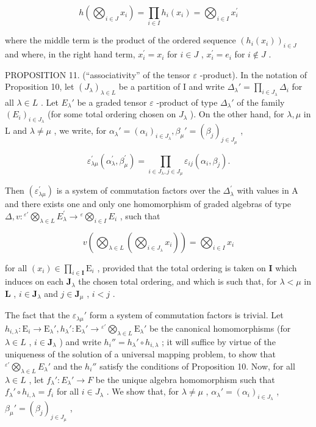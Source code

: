 \[
h \left(\bigotimes_ {i \in J} x _ {i}\right) = \prod_ {i \in I} h _ {i} \left(x _ {i}\right) = \bigotimes_ {i \in I} x _ {i} ^ {\prime}
\]

where the middle term is the product of the ordered sequence \((h_i(x_i))_{i\in J}\) and where, in the right hand term, \(x_{i}^{\prime} = x_{i}\) for \(i\in J\) , \(x_{i}^{\prime} = e_{i}\) for \(i\notin J\) .

PROPOSITION 11. (``associativity'' of the tensor \(\varepsilon\) -product). In the notation of Proposition 10, let \((J_{\lambda})_{\lambda \in L}\) be a partition of I and write \(\Delta_{\lambda}' = \prod_{i \in J_{\lambda}} \Delta_i\) for all \(\lambda \in L\) . Let \(E_{\lambda}'\) be a graded tensor \(\varepsilon\) -product of type \(\Delta_{\lambda}'\) of the family \((E_i)_{i \in J_{\lambda}}\) (for some total ordering chosen on \(J_{\lambda}\) ). On the other hand, for \(\lambda, \mu\) in L and \(\lambda \neq \mu\) , we write, for \(\alpha_{\lambda}' = (\alpha_i)_{i \in J_{\lambda}}, \beta_{\mu}' = (\beta_j)_{j \in J_{\mu}}\) ,

\[
\varepsilon_ {\lambda \mu} ^ {\prime} (\alpha _ {\lambda} ^ {\prime}, \beta_ {\mu} ^ {\prime}) = \prod_ {i \in J _ {\lambda}, j \in J _ {\mu}} \varepsilon_ {i j} (\alpha_ {i}, \beta_ {j}).\tag{32}
\]

Then \((\varepsilon_{\lambda \mu}^{\prime})\) is a system of commutation factors over the \(\Delta_{\lambda}^{\prime}\) with values in A and there exists one and only one homomorphism of graded algebras of type \(\Delta, v: {}^{\varepsilon'}\bigotimes_{\lambda \in L} E_{\lambda}^{\prime} \to {}^{\varepsilon}\bigotimes_{i \in I} E_{i}\) , such that

\[
v \left(\bigotimes_ {\lambda \in L} \left(\bigotimes_ {i \in J _ {\lambda}} x _ {i}\right)\right) = \bigotimes_ {i \in I} x _ {i}\tag{33}
\]

for all \((x_{i})\in \prod_{i\in \mathbf{I}}\mathrm{E}_{i}\) , provided that the total ordering is taken on \(\mathbf{I}\) which induces on each \(\mathbf{J}_{\lambda}\) the chosen total ordering, and which is such that, for \(\lambda < \mu\) in \(\mathbf{L}\) , \(i\in \mathbf{J}_{\lambda}\) and \(j\in \mathbf{J}_{\mu}\) , \(i < j\) .

The fact that the \(\varepsilon_{\lambda \mu}'\) form a system of commutation factors is trivial. Let \(h_{i,\lambda}:\mathrm{E}_i\to \mathrm{E}_{\lambda}', h_{\lambda}':\mathrm{E}_{\lambda}'\to {}^{\varepsilon'}\bigotimes_{\lambda \in L}\mathrm{E}_{\lambda}'\) be the canonical homomorphisms (for \(\lambda \in L\) , \(i\in \mathbf{J}_{\lambda}\) ) and write \(h_i'' = h_\lambda' \circ h_{i,\lambda}\) ; it will suffice by virtue of the uniqueness of the solution of a universal mapping problem, to show that \({}^{\varepsilon'}\bigotimes_{\lambda \in L} E_{\lambda}'\) and the \(h_i''\) satisfy the conditions of Proposition 10. Now, for all \(\lambda \in L\) , let \(f_{\lambda}': E_{\lambda}' \to F\) be the unique algebra homomorphism such that \(f_{\lambda}' \circ h_{i,\lambda} = f_i\) for all \(i \in J_{\lambda}\) . We show that, for \(\lambda \neq \mu\) , \(\alpha_{\lambda}' = (\alpha_i)_{i \in J_{\lambda}}\) , \(\beta_{\mu}' = (\beta_j)_{j \in J_{\mu}}\) ,


